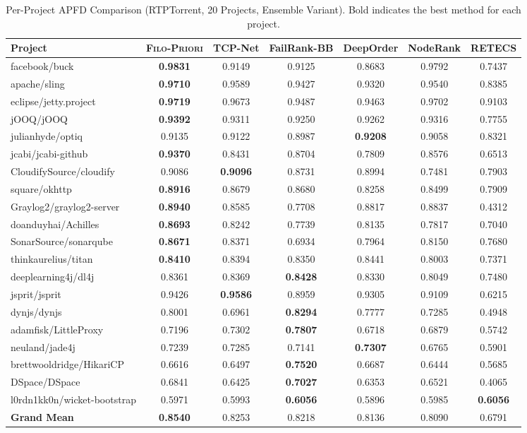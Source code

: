 \documentclass[10pt,journal,compsoc]{IEEEtran}
\newcommand{\filopriori}{\textsc{Filo-Priori}}
\begin{document}
\begin{table}[!t]
\centering
\caption{Per-Project APFD Comparison (RTPTorrent, 20 Projects, Ensemble Variant). Bold indicates the best method for each project.}
\label{tab:rtptorrent_perproject}
\footnotesize
\begin{tabular}{lcccccc}
\toprule
\textbf{Project} & \textbf{\filopriori{}} & \textbf{TCP-Net} & \textbf{FailRank-BB} & \textbf{DeepOrder} & \textbf{NodeRank} & \textbf{RETECS} \\
\midrule
facebook/buck & \textbf{0.9831} & 0.9149 & 0.9125 & 0.8683 & 0.9792 & 0.7437 \\
apache/sling & \textbf{0.9710} & 0.9589 & 0.9427 & 0.9320 & 0.9540 & 0.8385 \\
eclipse/jetty.project & \textbf{0.9719} & 0.9673 & 0.9487 & 0.9463 & 0.9702 & 0.9103 \\
jOOQ/jOOQ & \textbf{0.9392} & 0.9311 & 0.9250 & 0.9262 & 0.9316 & 0.7755 \\
julianhyde/optiq & 0.9135 & 0.9122 & 0.8987 & \textbf{0.9208} & 0.9058 & 0.8321 \\
jcabi/jcabi-github & \textbf{0.9370} & 0.8431 & 0.8704 & 0.7809 & 0.8576 & 0.6513 \\
CloudifySource/cloudify & 0.9086 & \textbf{0.9096} & 0.8731 & 0.8994 & 0.7481 & 0.7903 \\
square/okhttp & \textbf{0.8916} & 0.8679 & 0.8680 & 0.8258 & 0.8499 & 0.7909 \\
Graylog2/graylog2-server & \textbf{0.8940} & 0.8585 & 0.7708 & 0.8817 & 0.8837 & 0.4312 \\
doanduyhai/Achilles & \textbf{0.8693} & 0.8242 & 0.7739 & 0.8135 & 0.7817 & 0.7040 \\
SonarSource/sonarqube & \textbf{0.8671} & 0.8371 & 0.6934 & 0.7964 & 0.8150 & 0.7680 \\
thinkaurelius/titan & \textbf{0.8410} & 0.8394 & 0.8350 & 0.8441 & 0.8003 & 0.7371 \\
deeplearning4j/dl4j & 0.8361 & 0.8369 & \textbf{0.8428} & 0.8330 & 0.8049 & 0.7480 \\
jsprit/jsprit & 0.9426 & \textbf{0.9586} & 0.8959 & 0.9305 & 0.9109 & 0.6215 \\
dynjs/dynjs & 0.8001 & 0.6961 & \textbf{0.8294} & 0.7777 & 0.7285 & 0.4948 \\
adamfisk/LittleProxy & 0.7196 & 0.7302 & \textbf{0.7807} & 0.6718 & 0.6879 & 0.5742 \\
neuland/jade4j & 0.7239 & 0.7285 & 0.7141 & \textbf{0.7307} & 0.6765 & 0.5901 \\
brettwooldridge/HikariCP & 0.6616 & 0.6497 & \textbf{0.7520} & 0.6687 & 0.6444 & 0.5685 \\
DSpace/DSpace & 0.6841 & 0.6425 & \textbf{0.7027} & 0.6353 & 0.6521 & 0.4065 \\
l0rdn1kk0n/wicket-bootstrap & 0.5971 & 0.5993 & \textbf{0.6056} & 0.5896 & 0.5985 & \textbf{0.6056} \\
\midrule
\textbf{Grand Mean} & \textbf{0.8540} & 0.8253 & 0.8218 & 0.8136 & 0.8090 & 0.6791 \\
\bottomrule
\end{tabular}
\end{table}
\end{document}
